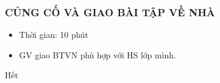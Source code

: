 \documentclass[../main.tex]{subfiles}
\begin{document}
\subsubsection{CỦNG CỐ VÀ GIAO BÀI TẬP VỀ NHÀ}
\begin{hd}
    \begin{itemize}
        \item Thời gian: 10 phút
    \end{itemize}
\end{hd}
\begin{itemize}
    \item GV giao BTVN phù hợp với HS lớp mình.
\end{itemize}

\begin{center}
       \faGg\faGg\quad Hết \quad\faGg\faGg
\end{center}
\end{document}
